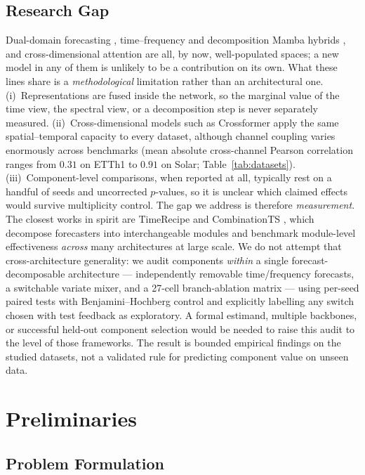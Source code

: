 \documentclass[review,12pt]{elsarticle}
\begin{document}
\subsection{Research Gap}
Dual-domain forecasting \cite{tf4tf}, time--frequency and decomposition
Mamba hybrids \cite{decmamba,msmamba}, and cross-dimensional attention
\cite{crossformer,itransformer} are all, by now, well-populated spaces; a
new model in any of them is unlikely to be a contribution on its own. What
these lines share is a \emph{methodological} limitation rather than an
architectural one. (i)~Representations are fused inside the network, so the
marginal value of the time view, the spectral view, or a decomposition step
is never separately measured. (ii)~Cross-dimensional models such as
Crossformer apply the same spatial--temporal capacity to every dataset,
although channel coupling varies enormously across benchmarks (mean
absolute cross-channel Pearson correlation ranges from $0.31$ on ETTh1 to
$0.91$ on Solar; Table~\ref{tab:datasets}). (iii)~Component-level
comparisons, when reported at all, typically rest on a handful of seeds and
uncorrected $p$-values, so it is unclear which claimed effects would survive
multiplicity control. The gap we address is therefore \emph{measurement}.
The closest works in spirit are TimeRecipe \cite{timerecipe} and
CombinationTS \cite{combinationts}, which decompose forecasters into
interchangeable modules and benchmark module-level effectiveness
\emph{across} many architectures at large scale. We do not attempt that
cross-architecture generality: we audit components \emph{within} a single
forecast-decomposable architecture --- independently removable
time/frequency forecasts, a switchable variate mixer, and a 27-cell
branch-ablation matrix --- using per-seed paired tests with
Benjamini--Hochberg control and explicitly labelling any switch chosen with
test feedback as exploratory. A formal estimand, multiple backbones, or
successful held-out component selection would be needed to raise this audit
to the level of those frameworks. The result is bounded empirical findings on
the studied datasets, not a validated rule for predicting component value on
unseen data.

\section{Preliminaries}
\label{sec:prelim}

\subsection{Problem Formulation}
\label{sec:problem}
\end{document}
